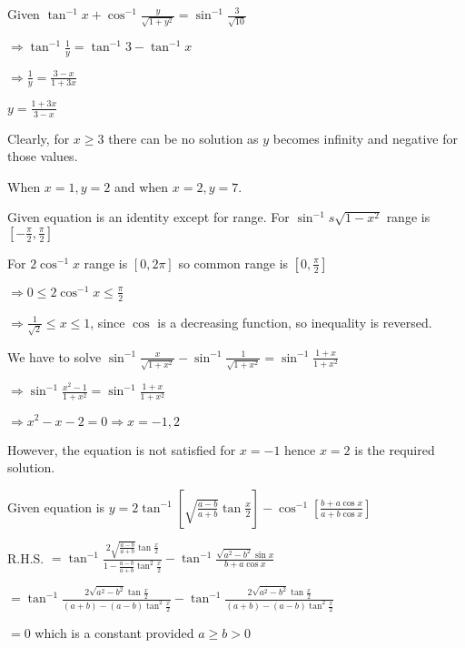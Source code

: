 \item Given $\tan^{-1}x + \cos^{-1}\frac{y}{\sqrt{1 + y^2}} = \sin^{-1}\frac{3}{\sqrt{10}}$

  $\Rightarrow \tan^{-1}\frac{1}{y} = \tan^{-1}3 - \tan^{-1}x$

  $\Rightarrow \frac{1}{y} = \frac{3 - x}{1 + 3x}$

  $y = \frac{1 + 3x}{3 - x}$

  Clearly, for $x \geq 3$ there can be no solution as $y$ becomes infinity and negative for those values.

  When $x = 1, y = 2$ and when $x = 2, y = 7$.

\item Given equation is an identity except for range. For $\sin^{-1}s\sqrt{1 - x^2}$ range is $\left[-\frac{\pi}{2},
  \frac{\pi}{2}\right]$

  For $2\cos^{-1}x$ range is $[0, 2\pi]$ so common range is $\left[0, \frac{\pi}{2}\right]$

  $\Rightarrow 0 \leq 2\cos^{-1}x \leq \frac{\pi}{2}$

  $\Rightarrow \frac{1}{\sqrt{2}}\leq x \leq 1$, since $\cos$ is a decreasing function, so inequality is reversed.

\item We have to solve $\sin^{-1}\frac{x}{\sqrt{1 + x^2}} - \sin^{-1}\frac{1}{\sqrt{1 + x^2}} = \sin^{-1}\frac{1 + x}{1 +
  x^2}$

  $\Rightarrow \sin^{-1}\frac{x^2 - 1}{1 + x^2} = \sin^{-1}\frac{1 + x}{1 + x^2}$

  $\Rightarrow x^2 - x - 2 = 0 \Rightarrow x = -1, 2$

  However, the equation is not satisfied for $x = -1$ hence $x = 2$ is the required solution.

\item Given equation is $y = 2\tan^{-1}\left[\sqrt{\frac{a - b}{a + b}}\tan\frac{x}{2}\right] - \cos^{-1}\left[\frac{b +
    a\cos x}{a + b\cos x}\right]$

  R.H.S. $= \tan^{-1}\frac{2\sqrt{\frac{a - b}{a + b}}\tan\frac{x}{2}}{1 - \frac{a - b}{a + b}\tan^2\frac{x}{2}} -
  \tan^{-1}\frac{\sqrt{a^2 - b^2}\sin x}{b + a\cos x}$

  $= \tan^{-1}\frac{2\sqrt{a^2 - b^2}\tan\frac{x}{2}}{(a + b) - (a - b)\tan^2\frac{x}{2}} - \tan^{-1}\frac{2\sqrt{a^2 -
      b^2}\tan\frac{x}{2}}{(a + b) - (a - b)\tan^2\frac{x}{2}}$

  $= 0$ which is a constant provided $a \geq b > 0$


